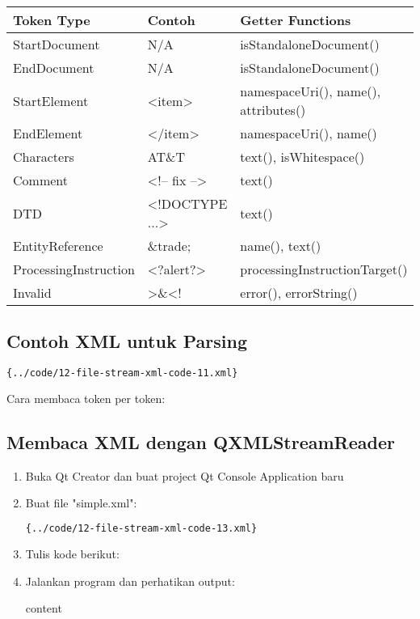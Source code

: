 \begin{center}
\begin{tabular}{|l|l|l|}
\hline
\textbf{Token Type} & \textbf{Contoh} & \textbf{Getter Functions} \\
\hline
StartDocument & N/A & isStandaloneDocument() \\
\hline
EndDocument & N/A & isStandaloneDocument() \\
\hline
StartElement & <item> & namespaceUri(), name(), attributes() \\
\hline
EndElement & </item> & namespaceUri(), name() \\
\hline
Characters & AT\&T & text(), isWhitespace() \\
\hline
Comment & <!-- fix --> & text() \\
\hline
DTD & <!DOCTYPE ...> & text() \\
\hline
EntityReference & \&trade; & name(), text() \\
\hline
ProcessingInstruction & <?alert?> & processingInstructionTarget() \\
\hline
Invalid & >\&<! & error(), errorString() \\
\hline
\end{tabular}
\end{center}

\subsection{Contoh XML untuk Parsing}

\begin{lstlisting}[language=xml]{../code/12-file-stream-xml-code-11.xml}
\end{lstlisting}

Cara membaca token per token:



\subsection{Membaca XML dengan QXMLStreamReader}

\begin{enumerate}
\item Buka Qt Creator dan buat project Qt Console Application baru
\item Buat file "simple.xml":

\begin{lstlisting}[language=xml]{../code/12-file-stream-xml-code-13.xml}
\end{lstlisting}

\item Tulis kode berikut:



\item Jalankan program dan perhatikan output:

\begin{lcverbatim}
content
\end{lcverbatim}
\end{enumerate}

